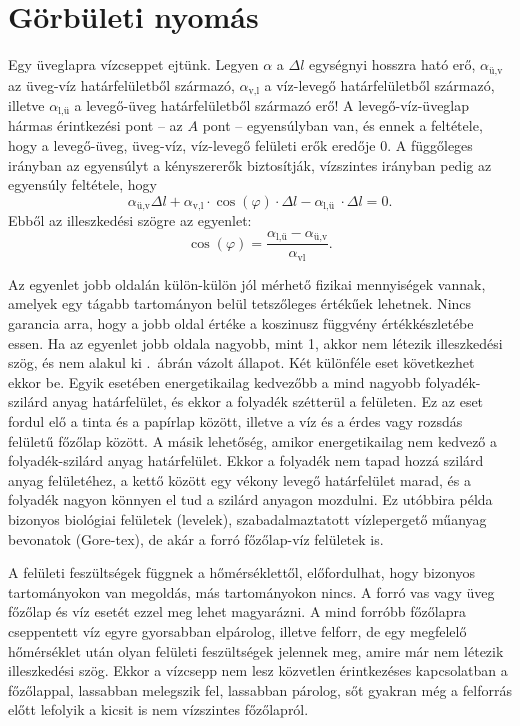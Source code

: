 \documentclass[12pt,a4paper]{scrartcl}
\begin{document}
\normalsize

\section{Görbületi nyomás}

Egy üveglapra vízcseppet ejtünk. Legyen $\alpha$ a $\Delta l$ egységnyi hosszra ható erő, $\alpha_{\text{ü,v}}$ az üveg-víz határfelületből származó, $\alpha_{\text{v,l}}$ a víz-levegő határfelületből származó, illetve $\alpha_{\text{l,ü}}$ a levegő-üveg határfelületből származó erő! A levegő-víz-üveglap hármas érintkezési pont -- az $A$ pont -- egyensúlyban van, és ennek a feltétele, hogy a levegő-üveg, üveg-víz, víz-levegő felületi erők eredője 0. A függőleges irányban az egyensúlyt a kényszererők biztosítják, vízszintes irányban pedig az egyensúly feltétele, hogy 
\[{\alpha _{{\text{ü,v}}}}\Delta l + {\alpha _{{\text{v,l}}}} \cdot \cos \left( \varphi  \right) \cdot \Delta l - {\alpha _{{\text{l,ü }}}} \cdot \Delta l = 0.\]
Ebből az illeszkedési szögre az egyenlet:
\begin{equation} \label{eq:illeszkedesi_szog}
\cos{{\left( \varphi  \right)}}=\frac{\alpha_{\text{l,ü}}-\alpha_{\text{ü,v}}}{\alpha_{\text{vl}}}.
\end{equation}


Az egyenlet jobb oldalán külön-külön jól mérhető fizikai mennyiségek vannak, amelyek egy tágabb tartományon belül tetszőleges értékűek lehetnek. Nincs garancia arra, hogy a jobb oldal értéke a koszinusz függvény értékkészletébe essen. Ha az egyenlet jobb oldala nagyobb, mint 1, akkor nem létezik illeszkedési szög, és nem alakul ki .\ ábrán vázolt állapot. Két különféle eset következhet ekkor be. Egyik esetében energetikailag kedvezőbb a mind nagyobb folyadék-szilárd anyag határfelület, és ekkor a folyadék szétterül a felületen. Ez az eset fordul elő a tinta és a papírlap között, illetve a víz és a érdes vagy rozsdás felületű főzőlap között. A másik lehetőség, amikor energetikailag nem kedvező a folyadék-szilárd anyag határfelület. Ekkor a folyadék nem tapad hozzá szilárd anyag felületéhez, a kettő között egy vékony levegő határfelület marad, és a folyadék nagyon könnyen el tud a szilárd anyagon mozdulni. Ez utóbbira példa bizonyos biológiai felületek (levelek), szabadalmaztatott vízlepergető műanyag bevonatok (Gore-tex), de akár a forró főzőlap-víz felületek is.

A felületi feszültségek függnek a hőmérséklettől, előfordulhat, hogy bizonyos tartományokon van megoldás, más tartományokon nincs. A forró vas vagy üveg főzőlap és víz esetét ezzel meg lehet magyarázni. A mind forróbb főzőlapra cseppentett víz egyre gyorsabban elpárolog, illetve felforr, de egy megfelelő hőmérséklet után olyan felületi feszültségek jelennek meg, amire már nem létezik illeszkedési szög. Ekkor a vízcsepp nem lesz közvetlen érintkezéses kapcsolatban a főzőlappal, lassabban melegszik fel, lassabban párolog, sőt gyakran még a felforrás előtt lefolyik a kicsit is nem vízszintes főzőlapról.
\end{document}

